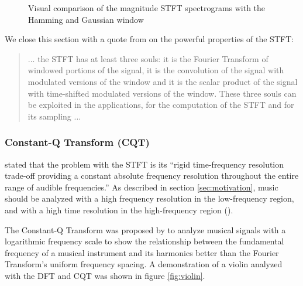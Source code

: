 \documentclass[report.tex]{subfiles}
\begin{document}
\begin{figure}[ht]
	\hspace{0.1em}
	\caption{Visual comparison of the magnitude STFT spectrograms with the Hamming and Gaussian window}
	\label{fig:stfts}
\end{figure}

We close this section with a quote from \textcite{doerflersouls} on the powerful properties of the STFT:

\begin{quote}
       ... the STFT has at least three souls: it is the Fourier Transform of windowed portions of the signal, it is the convolution of the signal with modulated versions of the window and it is the scalar product of the signal with time-shifted modulated versions of the window. These three souls can be exploited in the applications, for the computation of the STFT and for its sampling ...
\end{quote}

\newpagefill

\subsubsection{Constant-Q Transform (CQT)}
\label{sec:cqt}

\textcite{cqtransient} stated that the problem with the STFT is its ``rigid time-frequency resolution trade-off providing a constant absolute frequency resolution throughout the entire range of audible frequencies.'' As described in section \ref{sec:motivation}, music should be analyzed with a high frequency resolution in the low-frequency region, and with a high time resolution in the high-frequency region (\cite{doerflerphd, cqtransient}). 

The Constant-Q Transform was proposed by \textcite{jbrown, msp} to analyze musical signals with a logarithmic frequency scale to show the relationship between the fundamental frequency of a musical instrument and its harmonics better than the Fourier Transform's uniform frequency spacing. A demonstration of a violin analyzed with the DFT and CQT was shown in figure \ref{fig:violin}.
\end{document}
